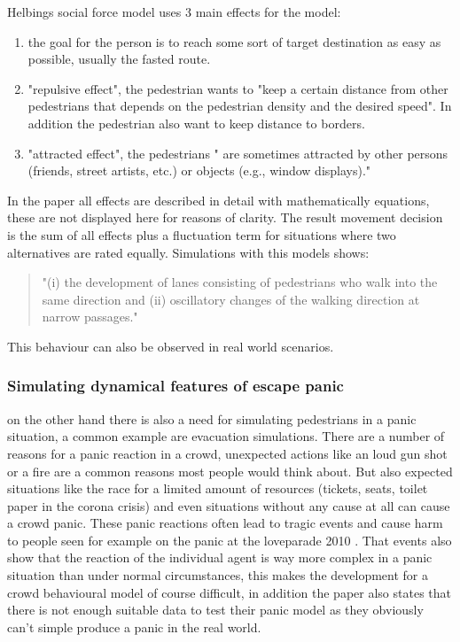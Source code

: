 \documentclass[sigconf]{acmart}
\begin{document}
Helbings social force model uses 3 main effects for the model:
\begin{enumerate}
    \item the goal for the person is to reach some sort of target destination as easy as possible, usually the fasted route.
    \item "repulsive effect", the pedestrian wants to "keep a certain distance from other pedestrians that depends on the pedestrian density and the desired speed". In addition the pedestrian also want to keep distance to borders.  
    \item "attracted effect", the pedestrians " are sometimes attracted by other persons (friends, street artists, etc.) or objects (e.g., window displays)."
\end{enumerate}
In the paper all effects are described in detail with mathematically equations, these are not displayed here for reasons of clarity. The result movement decision is the sum of all effects plus a fluctuation term for situations where two alternatives are rated equally. Simulations with this models shows:
\begin{quote}
    "(i) the development of lanes consisting of pedestrians who walk into the same direction and (ii) oscillatory changes of the walking direction at narrow passages."
\end{quote}
This behaviour can also be observed in real world scenarios. 

\subsubsection{Simulating dynamical features of escape panic}\cite{helbing_simulating_2000} on the other hand there is also a need for simulating pedestrians in a panic situation, a common example are evacuation simulations.
There are a number of reasons for a panic reaction in a crowd, unexpected actions like an loud gun shot or a fire are a common reasons most people would think about. But also expected situations like the race for a limited amount of resources (tickets, seats, toilet paper in the corona crisis)  and even situations without any cause at all can cause a crowd panic. These panic reactions often lead to tragic events and cause harm to people seen for example on the panic at the loveparade 2010 \cite{dumbs_massenpanik_2010} . That events also show that the reaction of the individual agent is way more complex in a panic situation than under normal circumstances, this makes the development for a crowd behavioural model of course difficult, in addition the paper also states that there is not enough suitable data to test their panic model as they obviously can't simple produce a panic in the real world. 
\end{document}
